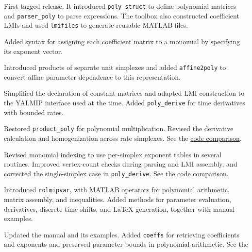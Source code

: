 \documentclass[english,11pt]{article}
\theoremstyle{break} \theorembodyfont{\small\rm}
\begin{document}
\begin{description}
\setlength{\itemsep}{2pt}
\item[\href{https://github.com/rolmip/rolmip/releases/tag/1.0}{1.0}]
  First tagged release. It introduced \texttt{poly\_struct} to define
  polynomial matrices and \texttt{parser\_poly} to parse expressions.
  The toolbox also constructed coefficient LMIs and used
  \texttt{lmifiles} to generate reusable MATLAB files.
\item[\href{https://github.com/rolmip/rolmip/releases/tag/1.1}{1.1}]
  Added syntax for assigning each coefficient matrix to a monomial
  by specifying its exponent vector.
\item[\href{https://github.com/rolmip/rolmip/releases/tag/2.0}{2.0}]
  Introduced products of separate unit simplexes and added
  \texttt{affine2poly} to convert affine parameter dependence to this
  representation.
\item[\href{https://github.com/rolmip/rolmip/releases/tag/2.1}{2.1}]
  Simplified the declaration of constant matrices and adapted LMI
  construction to the YALMIP interface used at the time.
  Added \texttt{poly\_derive} for time derivatives with bounded rates.
\item[\href{https://github.com/rolmip/rolmip/releases/tag/2.2}{2.2}]
  Restored \texttt{product\_poly} for polynomial multiplication.
  Revised the derivative calculation and homogenization across rate
  simplexes. See the
  \href{https://github.com/rolmip/rolmip/compare/2.1...2.2}{code comparison}.
\item[\href{https://github.com/rolmip/rolmip/releases/tag/2.3}{2.3}]
  Revised monomial indexing to use per-simplex exponent tables in
  several routines. Improved vertex-count checks during parsing and LMI
  assembly, and corrected the single-simplex case in \texttt{poly\_derive}.
  See the \href{https://github.com/rolmip/rolmip/compare/2.2...2.3}{code comparison}.
\item[\href{https://github.com/rolmip/rolmip/releases/tag/3.0a}{3.0a}]
  Introduced \texttt{rolmipvar}, with MATLAB operators for polynomial
  arithmetic, matrix assembly, and inequalities. Added methods for
  parameter evaluation, derivatives, discrete-time shifts, and \LaTeX{}
  generation, together with manual examples.
\item[\href{https://github.com/rolmip/rolmip/releases/tag/3.0}{3.0}]
  Updated the manual and its examples. Added \texttt{coeffs} for retrieving
  coefficients and exponents and preserved parameter bounds in polynomial
  arithmetic. See the

\end{description}
\end{document}
